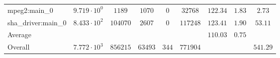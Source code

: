 \begin{tabular}{|l|c|c|c|c|c|c|c|c|}
mpeg2:main\_0           & $ 9.719 \cdot 10^{0} $ & $ 1189   $ & $ 1070  $ & $ 0   $ & $ 32768  $ & $ 122.34      $ & $ 1.83    $ & $ 2.73    $ \\
sha\_driver:main\_0     & $ 8.433 \cdot 10^{2} $ & $ 104070 $ & $ 2607  $ & $ 0   $ & $ 117248 $ & $ 123.41      $ & $ 1.90    $ & $ 53.11   $ \\
\hline
Average                 & $                    $ & $        $ & $       $ & $     $ & $        $ & $ 110.03      $ & $ 0.75    $ & $         $ \\
\hline
Overall                 & $ 7.772 \cdot 10^{3} $ & $ 856215 $ & $ 63493 $ & $ 344 $ & $ 771904 $ & $             $ & $         $ & $ 541.29  $ \\
\hline
\end{tabular}
